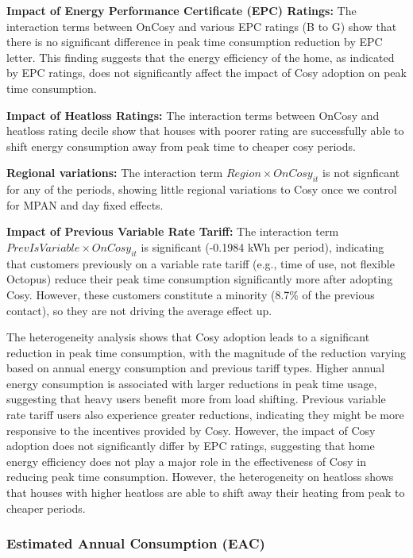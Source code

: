 \documentclass[
]{article}
\begin{document}
\textbf{Impact of Energy Performance Certificate (EPC) Ratings:} The interaction terms between OnCosy and various EPC ratings (B to G) show that there is no significant difference in peak time consumption reduction by EPC letter. This finding suggests that the energy efficiency of the home, as indicated by EPC ratings, does not significantly affect the impact of Cosy adoption on peak time consumption.

\textbf{Impact of Heatloss Ratings:} The interaction terms between OnCosy and heatloss rating decile show that houses with poorer rating are successfully able to shift energy consumption away from peak time to cheaper cosy periods.

\textbf{Regional variations:} The interaction term \(Region \times OnCosy_{it}\) is not signficant for any of the periods, showing little regional variations to Cosy once we control for MPAN and day fixed effects.

\textbf{Impact of Previous Variable Rate Tariff:} The interaction term \(Prev Is Variable \times OnCosy_{it}\) is significant (-0.1984 kWh per period), indicating that customers previously on a variable rate tariff (e.g., time of use, not flexible Octopus) reduce their peak time consumption significantly more after adopting Cosy. However, these customers constitute a minority (8.7\% of the previous contact), so they are not driving the average effect up.

The heterogeneity analysis shows that Cosy adoption leads to a significant reduction in peak time consumption, with the magnitude of the reduction varying based on annual energy consumption and previous tariff types. Higher annual energy consumption is associated with larger reductions in peak time usage, suggesting that heavy users benefit more from load shifting. Previous variable rate tariff users also experience greater reductions, indicating they might be more responsive to the incentives provided by Cosy. However, the impact of Cosy adoption does not significantly differ by EPC ratings, suggesting that home energy efficiency does not play a major role in the effectiveness of Cosy in reducing peak time consumption. However, the heterogeneity on heatloss shows that houses with higher heatloss are able to shift away their heating from peak to cheaper periods.

\subsubsection{Estimated Annual Consumption (EAC)}\label{estimated-annual-consumption-eac}
\end{document}
